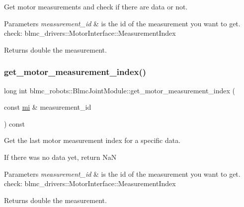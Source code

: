 Get motor measurements and check if there are data or not. 


\begin{DoxyParams}{Parameters}
{\em measurement\+\_\+id} & is the id of the measurement you want to get. check\+: blmc\+\_\+drivers\+::\+Motor\+Interface\+::\+Measurement\+Index \\
\hline
\end{DoxyParams}
\begin{DoxyReturn}{Returns}
double the measurement. 
\end{DoxyReturn}
\mbox{\label{classblmc__robots_1_1BlmcJointModule_adf5e083076bdc53f24f14f0c22b9061b}} 
\subsubsection{\texorpdfstring{get\+\_\+motor\+\_\+measurement\+\_\+index()}{get\_motor\_measurement\_index()}}
{\footnotesize\ttfamily long int blmc\+\_\+robots\+::\+Blmc\+Joint\+Module\+::get\+\_\+motor\+\_\+measurement\+\_\+index (\begin{DoxyParamCaption}\item[{const \hyperlink{common__header_8hpp_a1975c6bb47bc85dfc8edfe349c30dae1}{mi} \&}]{measurement\+\_\+id }\end{DoxyParamCaption}) const\hspace{0.3cm}{\ttfamily [private]}}



Get the last motor measurement index for a specific data. 

If there was no data yet, return NaN


\begin{DoxyParams}{Parameters}
{\em measurement\+\_\+id} & is the id of the measurement you want to get. check\+: blmc\+\_\+drivers\+::\+Motor\+Interface\+::\+Measurement\+Index \\
\hline
\end{DoxyParams}
\begin{DoxyReturn}{Returns}
double the measurement. 
\end{DoxyReturn}
\mbox{\label{classblmc__robots_1_1BlmcJointModule_af3f19ffc942e9b49dce892b207d3d476}} 

